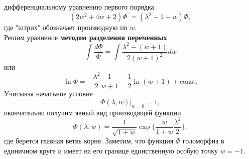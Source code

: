 \documentclass[12 pt, a4 paper]{article}
\theoremstyle{plain}   \newtheorem{Pro}{Задача}
\begin{document}
дифференциальному уравнению первого порядка
$$
  (2w^2 +4w +2)\Phi ^{\prime}=(\lambda ^2 -1 -w)\Phi ,
$$
где "штрих" обозначает производную по
$ w. $
\\
Решим уравнение
{\bfseries методом разделения переменных}
$$
  \int \frac{d\Phi}{\Phi}=
  \int \frac{\lambda ^2 -(w+1)}{2(w+1)^2}dw
$$
или
$$
  \ln \Phi =-\frac{\lambda ^2}{2}\frac{1}{w+1}
  -\frac{1}{2}\ln (w+1) + \mathrm{const}.
$$
Учитывая начальное условие
$$
  \Phi (\lambda , w) \biggr | _{w=0}=1,
$$
окончательно получим явный вид производящей функции
$$
  \Phi (\lambda ,w)=\frac{1}{\sqrt{1+w}}
  \exp \Biggl \{ \frac{w}{1+w}\frac{\lambda ^2}{2}
  \Biggr \} ,
$$
где берется главная ветвь корня. Заметим, что функция
$ \Phi $
голоморфна в единичном круге и имеет на его границе единственную
особую точку
$ w=-1. $
\\
\end{document}

